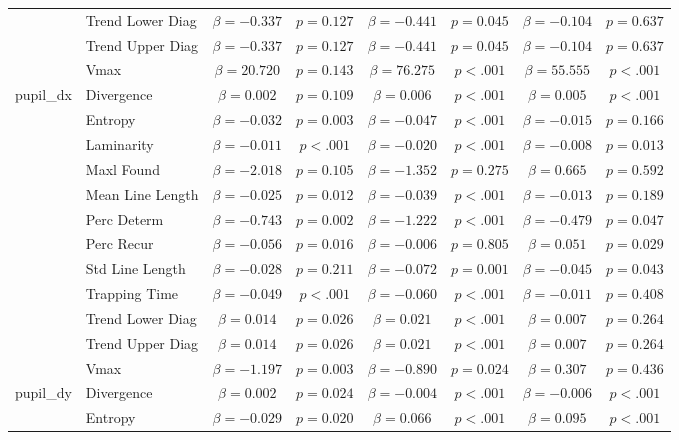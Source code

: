 \begin{tabular}{llcc|cc|cc}
 & Trend Lower Diag & $\beta = -0.337$ & $p = 0.127$ & $\beta = -0.441$ & $p = 0.045$ & $\beta = -0.104$ & $p = 0.637$ \\
 & Trend Upper Diag & $\beta = -0.337$ & $p = 0.127$ & $\beta = -0.441$ & $p = 0.045$ & $\beta = -0.104$ & $p = 0.637$ \\
 & Vmax & $\beta = 20.720$ & $p = 0.143$ & $\beta = 76.275$ & $p < .001$ & $\beta = 55.555$ & $p < .001$ \\
\midrule
\multirow{12}{*}{pupil_dx} & Divergence & $\beta = 0.002$ & $p = 0.109$ & $\beta = 0.006$ & $p < .001$ & $\beta = 0.005$ & $p < .001$ \\
 & Entropy & $\beta = -0.032$ & $p = 0.003$ & $\beta = -0.047$ & $p < .001$ & $\beta = -0.015$ & $p = 0.166$ \\
 & Laminarity & $\beta = -0.011$ & $p < .001$ & $\beta = -0.020$ & $p < .001$ & $\beta = -0.008$ & $p = 0.013$ \\
 & Maxl Found & $\beta = -2.018$ & $p = 0.105$ & $\beta = -1.352$ & $p = 0.275$ & $\beta = 0.665$ & $p = 0.592$ \\
 & Mean Line Length & $\beta = -0.025$ & $p = 0.012$ & $\beta = -0.039$ & $p < .001$ & $\beta = -0.013$ & $p = 0.189$ \\
 & Perc Determ & $\beta = -0.743$ & $p = 0.002$ & $\beta = -1.222$ & $p < .001$ & $\beta = -0.479$ & $p = 0.047$ \\
 & Perc Recur & $\beta = -0.056$ & $p = 0.016$ & $\beta = -0.006$ & $p = 0.805$ & $\beta = 0.051$ & $p = 0.029$ \\
 & Std Line Length & $\beta = -0.028$ & $p = 0.211$ & $\beta = -0.072$ & $p = 0.001$ & $\beta = -0.045$ & $p = 0.043$ \\
 & Trapping Time & $\beta = -0.049$ & $p < .001$ & $\beta = -0.060$ & $p < .001$ & $\beta = -0.011$ & $p = 0.408$ \\
 & Trend Lower Diag & $\beta = 0.014$ & $p = 0.026$ & $\beta = 0.021$ & $p < .001$ & $\beta = 0.007$ & $p = 0.264$ \\
 & Trend Upper Diag & $\beta = 0.014$ & $p = 0.026$ & $\beta = 0.021$ & $p < .001$ & $\beta = 0.007$ & $p = 0.264$ \\
 & Vmax & $\beta = -1.197$ & $p = 0.003$ & $\beta = -0.890$ & $p = 0.024$ & $\beta = 0.307$ & $p = 0.436$ \\
\midrule
\multirow{12}{*}{pupil_dy} & Divergence & $\beta = 0.002$ & $p = 0.024$ & $\beta = -0.004$ & $p < .001$ & $\beta = -0.006$ & $p < .001$ \\
 & Entropy & $\beta = -0.029$ & $p = 0.020$ & $\beta = 0.066$ & $p < .001$ & $\beta = 0.095$ & $p < .001$ \\

\end{tabular}
